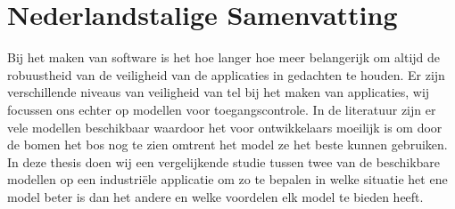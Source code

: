 \clearpage 
{} 
{}
\chapter*{Nederlandstalige Samenvatting}

Bij het maken van software is het hoe langer hoe meer belangerijk om altijd de robuustheid van de veiligheid van de applicaties in gedachten te houden.
Er zijn verschillende niveaus van veiligheid van tel bij het maken van applicaties, wij focussen ons echter op modellen voor toegangscontrole.
In de literatuur zijn er vele modellen beschikbaar waardoor het voor ontwikkelaars moeilijk is om door de bomen het bos nog te zien omtrent het model ze het beste kunnen gebruiken.
In deze thesis doen wij een vergelijkende studie tussen twee van de beschikbare modellen op een industriële applicatie om zo te bepalen in welke situatie het ene model beter is dan het andere en welke voordelen elk model te bieden heeft.
